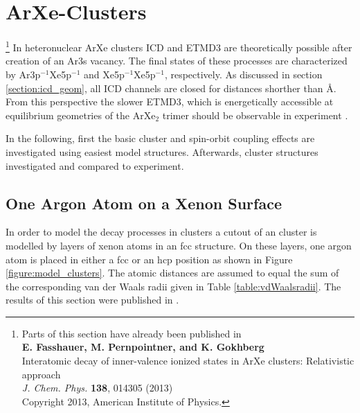 \section{ArXe-Clusters}
\let\thefootnote\relax\footnote{Parts of this section have already been published in\\
          \textbf{E. Fasshauer, M. Pernpointner, and K. Gokhberg}\\
          Interatomic decay of inner-valence ionized states in ArXe 
          clusters: Relativistic approach\\
          \emph{J. Chem. Phys.} \textbf{138}, 014305 (2013)\\
          Copyright 2013, American Institute of Physics.}
In heteronuclear ArXe clusters \ac{ICD} and \ac{ETMD}3 are theoretically
possible after creation of an Ar3s vacancy. The final states of these processes
are characterized by Ar3p$^{-1}$Xe5p$^{-1}$ and Xe5p$^{-1}$Xe5p$^{-1}$,
respectively. As discussed in section \ref{section:icd_geom}, all \ac{ICD}
channels are closed
for distances shorther than \unit[10]{\AA}. From this perspective the
slower \ac{ETMD}3, which is energetically accessible at equilibrium geometries
of the ArXe$_2$ trimer should be
observable in experiment \cite{Fasshauer10}. 

In the following, first the basic cluster and spin-orbit coupling effects
are investigated using easiest model
structures. Afterwards, cluster structures investigated and compared to experiment.


\subsection{One Argon Atom on a Xenon Surface}
In order to model the decay processes in clusters a cutout of an cluster
is modelled by layers of xenon atoms in an \ac{fcc} structure. On these
layers, one argon atom is placed in either a \ac{fcc} or an \ac{hcp} position
as shown in Figure \ref{figure:model_clusters}. The atomic distances are
assumed to equal the sum of the corresponding van der Waals radii given in
Table \ref{table:vdWaalsradii}. The results of this section were published
in \cite{Fasshauer13}.

